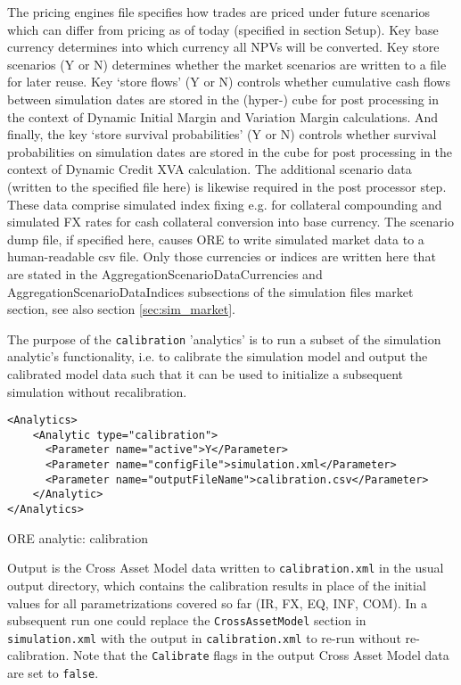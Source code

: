{The pricing engines file specifies how trades are priced under future scenarios which can differ from pricing as of
today (specified in section Setup).  Key base currency determines into which currency all NPVs will be converted. Key
store scenarios (Y or N) determines whether the market scenarios are written to a file for later reuse. Key
`store flows' (Y or N) controls whether cumulative cash flows between simulation dates are stored in the (hyper-)
cube for post processing in the context of Dynamic Initial Margin and Variation Margin calculations. And finally, the
key `store survival probabilities' (Y or N) controls whether survival probabilities on simulation dates are stored in the
cube for post processing in the context of Dynamic Credit XVA calculation. The additional
scenario data (written to the specified file here) is likewise required in the post processor step. These data comprise
simulated index fixing e.g. for collateral compounding and simulated FX rates for cash collateral conversion into base
currency. The scenario dump file, if specified here, causes ORE to write simulated market data to a human-readable csv
file. Only those currencies or indices are written here that are stated in the AggregationScenarioDataCurrencies and 
AggregationScenarioDataIndices subsections of the simulation files market section, see also section
\ref{sec:sim_market}.
 
\medskip The purpose of the {\tt calibration} 'analytics' is to run a subset of the simulation analytic's functionality,
i.e. to calibrate the simulation model and output the calibrated model data such that it can be used to initialize
a subsequent simulation without recalibration.

\begin{listing}[H]
\begin{verbatim}
<Analytics>
    <Analytic type="calibration">
      <Parameter name="active">Y</Parameter>
      <Parameter name="configFile">simulation.xml</Parameter>
      <Parameter name="outputFileName">calibration.csv</Parameter>
    </Analytic>
</Analytics>
\end{verbatim}
\caption{ORE analytic: calibration}
\label{lst:ore_calibration}
\end{listing}

Output is the Cross Asset Model data written to {\tt calibration.xml} in the usual output directory, which contains the calibration
results in place of the initial values for all parametrizations covered so far (IR, FX, EQ, INF, COM). In a subsequent run one could replace
the {\tt CrossAssetModel} section in {\tt simulation.xml} with the output in {\tt calibration.xml} to re-run without re-calibration.
Note that the {\tt Calibrate} flags in the output Cross Asset Model data are set to {\tt false}.

}
